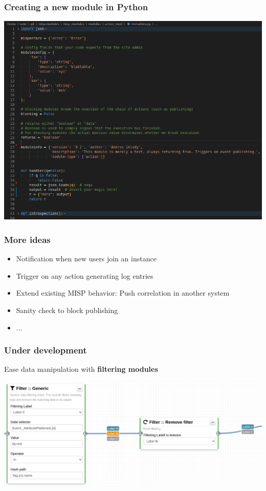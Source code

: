 \begin{frame}
    \frametitle{Creating a new module in Python}
    \begin{center}
        \includegraphics[width=1.0\linewidth]{pictures/custom-2.png}
    \end{center}
\end{frame}

\begin{frame}
    \frametitle{More ideas}
    \begin{itemize}
        \item Notification when new users join an instance
        \item Trigger on any action generating log entries
        \item Extend existing MISP behavior: Push correlation in another system
        \item Sanity check to block publishing
        \item ...
    \end{itemize}
\end{frame}

\begin{frame}
    \frametitle{Under development}
    Ease data manipulation with \textbf{filtering modules}
    \begin{center}
        \includegraphics[width=1.0\textwidth]{pictures/filtering-modules.png}
    \end{center}
\end{frame}

